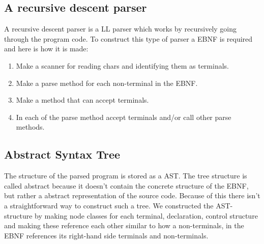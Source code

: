 	\subsection{A recursive descent parser}
		A recursive descent parser is a LL parser which works by recursively going through the program code.
		To construct this type of parser a EBNF is required and here is how it is made:
		\begin{enumerate}
			\item Make a scanner for reading chars and identifying them as terminals.
			\item Make a parse method for each non-terminal in the EBNF.
			\item Make a method that can accept terminals.
			\item In each of the parse method accept terminals and/or call other parse methods.
		\end{enumerate}		
	
	\subsection{Abstract Syntax Tree}
		The structure of the parsed program is stored as a AST. The tree structure is called abstract because it doesn't contain the concrete
		structure of the EBNF, but rather a abstract representation of the source code. Because of this there isn't a straightforward way to 
		construct such a tree. We constructed the AST-structure by making node classes for each terminal, declaration, control structure and making these 
		reference each other similar to how a non-terminals, in the EBNF references its right-hand side terminals and non-terminals.
		
		